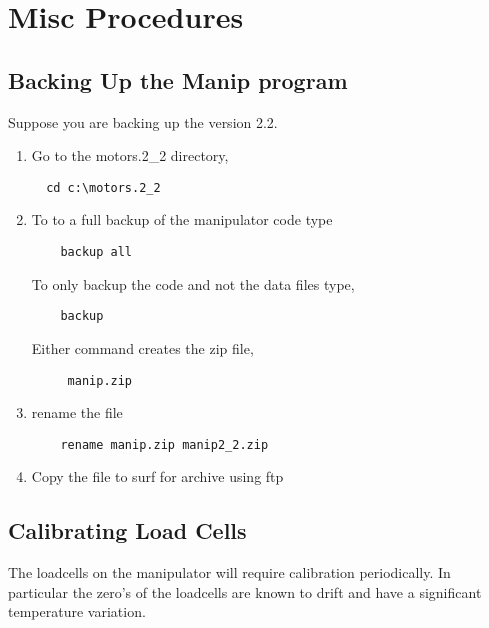 


\section{Misc Procedures}
  
\subsection{Backing Up the Manip program}
Suppose you are backing up the version 2.2.
\begin{enumerate}
\item Go to the motors.2\_2 directory,
\begin{verbatim}
  cd c:\motors.2_2
\end{verbatim}
\item To to a full backup of the manipulator code type
  \begin{verbatim}
    backup all
  \end{verbatim}
  To only backup the code and not the data files type,
  \begin{verbatim}
    backup
  \end{verbatim}
  Either command creates the zip file,
  \begin{verbatim}
     manip.zip
  \end{verbatim}
\item rename the file
  \begin{verbatim}
    rename manip.zip manip2_2.zip
  \end{verbatim}
\item Copy the file to surf for archive using ftp
\end{enumerate}

   


\subsection{Calibrating Load Cells}
  The loadcells on the manipulator will require calibration periodically.
In particular the zero's of the loadcells are known to drift and have a
significant temperature variation.
  



